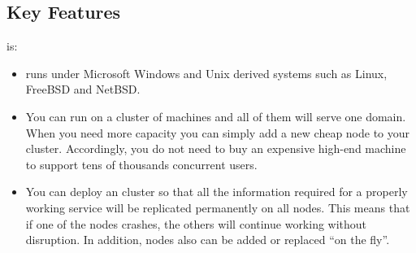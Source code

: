 \newpage
\subsection{Key Features}
\label{sec:keyfeatures}


\ejabberd{} is:
\begin{itemize}
\item {} \ejabberd{} runs under Microsoft Windows and Unix derived systems such as Linux, FreeBSD and NetBSD.

\item {} You can run \ejabberd{} on a cluster of machines and all of them will serve one \Jabber{} domain. When you need more capacity you can simply add a new cheap node to your cluster. Accordingly, you do not need to buy an expensive high-end machine to support tens of thousands concurrent users.

\item {} You can deploy an \ejabberd{} cluster so that all the information required for a properly working service will be replicated permanently on all nodes. This means that if one of the nodes crashes, the others will continue working without disruption. In addition, nodes also can be added or replaced ``on the fly''.


\end{itemize}
